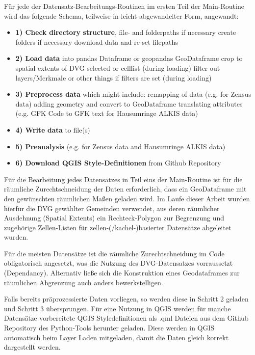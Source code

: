 		Für jede der Datensatz-Bearbeitungs-Routinen im ersten Teil der Main-Routine wird das folgende Schema, teilweise in leicht abgewandelter Form, angewandt:\\
		\begin{itemize}
			\item \textbf{1) Check directory structure}, file- and folderpaths
				\subitem if necessary create folders
				\subitem if necessary download data and re-set filepaths
			\item \textbf{2) Load data} into pandas Dataframe or geopandas GeoDataframe
				\subitem crop to spatial extents of DVG selected or celllist (during loading)
				\subitem filter out layers/Merkmale or other things if filters are set (during loading)
			\item \textbf{3) Preprocess data} which might include:
				\subitem remapping of data (e.g. for Zensus data)
				\subitem adding geometry and convert to GeoDataframe
				\subitem translating attributes (e.g. GFK Code to GFK text for Hausumringe ALKIS data)
			\item \textbf{4) Write data} to file(s)
			\item \textbf{5) Preanalysis} (e.g. for Zensus data and Hausumringe ALKIS data)
			\item \textbf{6) Download QGIS Style-Definitionen} from Github Repository
		\end{itemize}
		
		Für die Bearbeitung jedes Datensatzes in Teil eins der Main-Routine ist für die räumliche Zurechtschneidung der Daten erforderlich, dass ein GeoDataframe mit den gewünschten räumlichen Maßen geladen wird. Im Laufe dieser Arbeit wurden hierfür die DVG gewählter Gemeinden verwendet, aus deren räumlicher Ausdehnung (Spatial Extents) ein Rechteck-Polygon zur Begrenzung und zugehörige Zellen-Listen für zellen-(/kachel-)basierter Datensätze abgeleitet wurden. 
		
		Für die meisten Datensätze ist die räumliche Zurechtschneidung im Code obligatorisch angesetzt, was die Nutzung des DVG-Datensatzes vorraussetzt (Dependancy). Alternativ ließe sich die Konstruktion eines Geodataframes zur räumlichen Abgrenzung auch anders bewerkstelligen. 
		
		Falls bereits präprozessierte Daten vorliegen, so werden diese in Schritt 2 geladen und Schritt 3 übersprungen. Für eine Nutzung in QGIS werden für manche Datensätze vorbereitete QGIS Styledefinitionen als .qml Dateien aus dem Github Repository des Python-Tools herunter geladen. Diese werden in QGIS automatisch beim Layer Laden mitgeladen, damit die Daten gleich korrekt dargestellt werden. 
				
